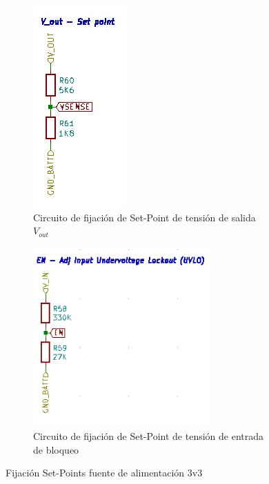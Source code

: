 \documentclass[10pt,a4paper]{article}
\begin{document}
\begin{itemize}
\begin{figure}[h!]
    \centering
    \begin{subfigure}[t]{0.45\textwidth}
        \centering
        \includegraphics[width=0.35\linewidth]{hardware/3v3/3v3_set_point.png}
        \caption{Circuito de fijación de Set-Point de tensión de salida
        $V_{out}$}
        \label{fig:3v3_set_point}
    \end{subfigure}
    \hfill
    \begin{subfigure}[t]{0.45\textwidth}
        \centering 
        \includegraphics[width=0.75\textwidth]{hardware/3v3/3v3_input_under_voltage.png}
        \caption{Circuito de fijación de Set-Point de tensión de entrada de
        bloqueo }
        \label{fig:3v3_input_under_voltage}
    \end{subfigure}
        \caption{Fijación Set-Points fuente de alimentación 3v3}
        \label{fig:cb_set_point}
\end{figure}
\FloatBarrier


\end{itemize}
\end{document}
